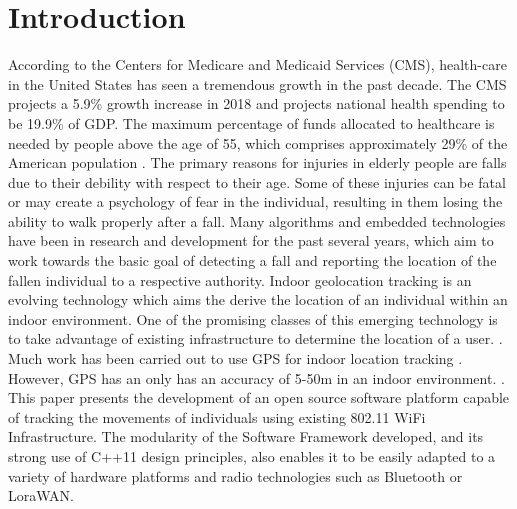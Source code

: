 \documentclass[conference]{IEEEtran}
\begin{document}
\section{Introduction}
According to the Centers for Medicare and Medicaid Services (CMS), health-care in the United States has seen a tremendous growth in the past decade. The CMS projects a 5.9\% growth increase in 2018 and projects national health spending to be 19.9\% of GDP. The maximum percentage of funds allocated to healthcare is needed by people above the age of 55, which comprises approximately 29\% of the American population \cite{hi}. The primary reasons for injuries in elderly people are falls due to their debility with respect to their age. Some of these injuries can be fatal or may create a psychology of fear in the individual, resulting in them losing the ability to walk properly after a fall. Many algorithms and embedded technologies have been in research and development for the past several years, which aim to work towards the basic goal of detecting a fall and reporting the location of the fallen individual to a respective authority.
\newline  Indoor geolocation tracking is an evolving technology which aims the derive the location of an individual within an indoor environment. One of the promising classes of this emerging technology is to take advantage of existing infrastructure to determine the location of a user. \cite{pahlavan2002indoor}. Much work has been carried out to use GPS for indoor location tracking \cite{kjaergaard2010indoor}. However, GPS has an only has an accuracy of 5-50m in an indoor environment. \cite{liu2007survey}.
\newline \indent This paper presents the development of an open source software platform capable of tracking the movements of individuals using existing 802.11 WiFi Infrastructure. The modularity of the Software Framework developed, and its strong use of C++11 design principles, also enables it to be easily adapted to a variety of hardware platforms and radio technologies such as Bluetooth or LoraWAN.
\end{document}

